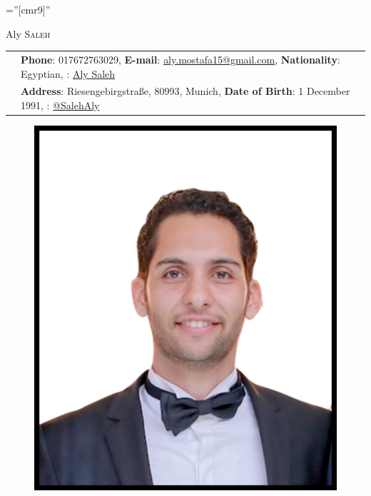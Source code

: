 \documentclass[a4paper,13pt]{article}
\begin{document}
\pagestyle{empty} %

\font\fb=''[cmr9]'' %


\par{\hspace{5cm}\huge Aly \textsc{Saleh}\par} %



\begin{adjustwidth}{-3cm}{}

\begin{tabular}{rl}
	&	\textbf{Phone}: 017672763029, 
		  \textbf{E-mail}: 	\href{mailto:aly.mostafa15@gmail.com}{aly.mostafa15@gmail.com},
 		  \textbf{Nationality}: Egyptian,  \faLinkedin: \href{https://de.linkedin.com/in/aly-saleh-ba948164}{Aly Saleh}
 
	\\&	\textbf{Address}: Riesengebirgstraße, 80993, Munich, 
		 \textbf{Date of Birth}: 1 December 1991,		 \faGithub:  \href{https://github.com/SalehAly}{@SalehAly}\\

\end{tabular}
\begin{figure}
	\begin{center}
	\hspace{14cm} \vspace{-3cm} \includegraphics[scale=0.06]{me.jpg}	
	\end{center}


\end{figure}
\end{adjustwidth}
\end{document}
